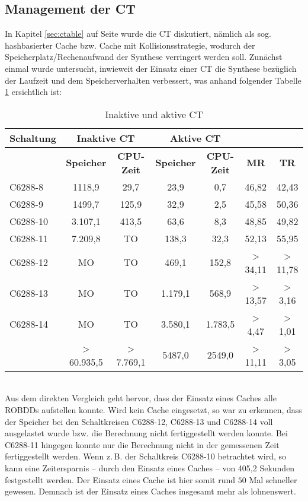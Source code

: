 \subsection{Management der CT}
\label{sec:vglcK}
In Kapitel \ref{sec:ctable} auf Seite \pageref{sec:ctable} wurde die CT diskutiert, nämlich als sog. hashbasierter Cache bzw. Cache mit Kollisionsstrategie, wodurch der Speicherplatz/Rechenaufwand der Synthese verringert werden soll. Zunächst einmal wurde untersucht, inwieweit der Einsatz einer CT die Synthese bezüglich der Laufzeit und dem Speicherverhalten verbessert, was anhand folgender Tabelle \ref{tab:ec} ersichtlich ist:
\begin{table}[bth]
	\footnotesize
	\centering
	\caption{Inaktive und aktive CT}
	\label{tab:ec}
	\begin{tabular}{ | l | c | c | c | c | c | c |}
		\hline
		\multicolumn{1}{|c|}{\textbf{Schaltung}} & \multicolumn{2}{c|}{\textbf{Inaktive CT}} & \multicolumn{2}{c|}{\textbf{Aktive CT}} & \multicolumn{2}{c|}{~} \\ \hline
		~ & \multicolumn{1}{c|}{\textbf{Speicher}} & \multicolumn{1}{c|}{\textbf{CPU-Zeit}} & \multicolumn{1}{c|}{\textbf{Speicher}} & \multicolumn{1}{c|}{\textbf{CPU-Zeit}} & \multicolumn{1}{c|}{\textbf{MR}} & \multicolumn{1}{c|}{\textbf{TR}}\\ \hline
		C6288-8 & 1118,9 & 29,7 & 23,9 & 0,7 & 46,82 & 42,43  \\ \hline
		C6288-9 & 1499,7 & 125,9 & 32,9 & 2,5 & 45,58 & 50,36  \\ \hline
		C6288-10 & 3.107,1 & 413,5 & 63,6 & 8,3 & 48,85 & 49,82  \\ \hline
		C6288-11 & 7.209,8 & TO & 138,3 & 32,3 & 52,13 & 55,95  \\ \hline
		C6288-12 & MO & TO & 469,1 & 152,8 & > 34,11 & > 11,78  \\ \hline
		C6288-13 & MO & TO & 1.179,1 & 568,9 & > 13,57 & > 3,16 \\ \hline
		C6288-14 & MO & TO & 3.580,1 & 1.783,5 & > 4,47 & > 1,01 \\ \hlineB{3}
		\multicolumn{1}{|c|}{\textbf{Gesamt}} & > 60.935,5 & > 7.769,1 & 5487,0 & 2549,0 & > 11,11 & > 3,05 \\ \hline
	\end{tabular}
\end{table}\\
Aus dem direkten Vergleich geht hervor, dass der Einsatz eines Caches alle ROBDDs aufstellen konnte. Wird kein Cache eingesetzt, so war zu erkennen, dass der Speicher bei den Schaltkreisen \glqq C6288-12\grqq{}, \glqq C6288-13\grqq{} und \glqq C6288-14\grqq{} voll ausgelastet wurde bzw. die Berechnung nicht fertiggestellt werden konnte. Bei \glqq C6288-11\grqq{} hingegen konnte nur die Berechnung nicht in der gemessenen Zeit fertiggestellt werden. Wenn z.\,B. der Schaltkreis \glqq C6288-10\grqq{} betrachtet wird, so kann eine Zeitersparnis -- durch den Einsatz eines Caches -- von 405,2 Sekunden festgestellt werden. Der Einsatz eines Cache ist hier somit rund $50$ Mal schneller gewesen. Demnach ist der Einsatz eines Caches insgesamt mehr als lohnenswert.\\

